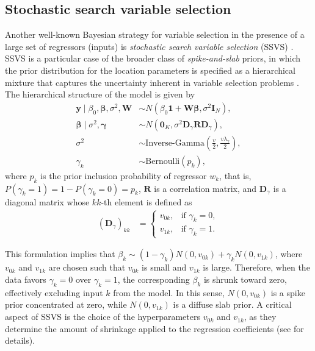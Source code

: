\subsection{Stochastic search variable selection}\label{sec13_22}
Another well-known Bayesian strategy for variable selection in the presence of a large set of regressors (inputs) is \textit{stochastic search variable selection} (SSVS) \cite{george1993variable,George1997}. SSVS is a particular case of the broader class of \textit{spike-and-slab} priors, in which the prior distribution for the location parameters is specified as a hierarchical mixture that captures the uncertainty inherent in variable selection problems \cite{Ishwaran2005}. The hierarchical structure of the model is given by
\begin{align*}
	\mathbf{y} \mid \beta_0, \boldsymbol{\beta}, \sigma^2, \mathbf{W} &\sim {N}(\beta_0 \mathbf{1} + \mathbf{W} \boldsymbol{\beta}, \sigma^2 \mathbf{I}_N), \\
	\boldsymbol{\beta} \mid \sigma^2, \boldsymbol{\gamma} &\sim {N}(\mathbf{0}_K, \sigma^2 \mathbf{D}_{\gamma} \mathbf{R} \mathbf{D}_{\gamma}), \\
	\sigma^2 &\sim \text{Inverse-Gamma}\left(\frac{v}{2}, \frac{v\lambda_{\gamma}}{2}\right), \\
	\gamma_k &\sim \text{Bernoulli}(p_k),
\end{align*}
where \(p_k\) is the prior inclusion probability of regressor \(w_k\), that is, \(P(\gamma_k = 1) = 1 - P(\gamma_k = 0) = p_k\), \(\mathbf{R}\) is a correlation matrix, and \(\mathbf{D}_{\gamma}\) is a diagonal matrix whose \(kk\)-th element is defined as
\begin{align*}
	(\mathbf{D}_{\gamma})_{kk} &= 
	\begin{cases}
		v_{0k}, & \text{if } \gamma_k = 0, \\
		v_{1k}, & \text{if } \gamma_k = 1.
	\end{cases}
\end{align*}

This formulation implies that \(\beta_k \sim (1 - \gamma_k) {N}(0, v_{0k}) + \gamma_k {N}(0, v_{1k})\), where \(v_{0k}\) and \(v_{1k}\) are chosen such that \(v_{0k}\) is small and \(v_{1k}\) is large. Therefore, when the data favors \(\gamma_k = 0\) over \(\gamma_k = 1\), the corresponding \(\beta_k\) is shrunk toward zero, effectively excluding input \(k\) from the model. In this sense, \({N}(0, v_{0k})\) is a spike prior concentrated at zero, while \({N}(0, v_{1k})\) is a diffuse slab prior. A critical aspect of SSVS is the choice of the hyperparameters \(v_{0k}\) and \(v_{1k}\), as they determine the amount of shrinkage applied to the regression coefficients (see \cite{george1993variable,George1997} for details).

